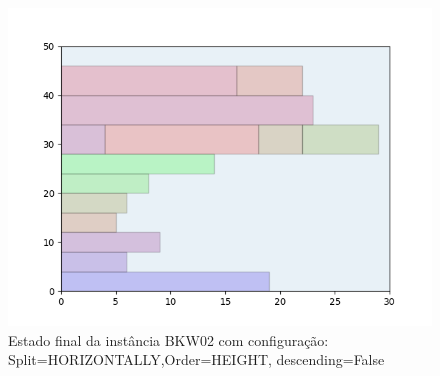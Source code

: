 \begin{figure}[H]
    \centering
    \caption[]{Estado final da instância BKW02 com configuração: Split=HORIZONTALLY,Order=HEIGHT, descending=False}
    \label{fig:bkw02-horizontally-height-false}
    \includegraphics[scale=0.5]{output/figures/bkw/bkw02/horizontally/height/false/00}
\end{figure}